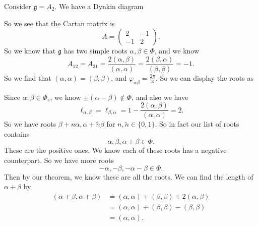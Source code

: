 \documentclass[a4paper]{article}
\begin{document}
\begin{eg}
  Consider $\mathfrak{g} = A_2$. We have a Dynkin diagram
  \begin{center}
  \end{center}
  So we see that the Cartan matrix is
  \[
    A =
    \begin{pmatrix}
      2 & -1\\
      -1 & 2
    \end{pmatrix}.
  \]
  So we know that $\mathfrak{g}$ has two simple roots $\alpha, \beta \in \Phi$, and we know
  \[
    A_{12} = A_{21} = \frac{2(\alpha, \beta)}{(\alpha, \alpha)} = \frac{2(\beta, \alpha)}{(\beta, \beta)} = -1.
  \]
  So we find that $(\alpha, \alpha) = (\beta, \beta)$, and $\varphi_{\alpha\beta} = \frac{2\pi}{3}$. So we can display the roots as
  \begin{center}
  \end{center}
  Since $\alpha, \beta \in \Phi_s$, we know $\pm(\alpha - \beta) \not\in \Phi$, and also we have
  \[
    \ell_{\alpha, \beta} = \ell_{\beta, \alpha} = 1 - \frac{2 (\alpha, \beta)}{(\alpha, \alpha)} = 2.
  \]
  So we have roots $\beta + n \alpha, \alpha + \tilde{n}\beta$ for $n, \tilde{n} \in \{0, 1\}$. So in fact our list of roots contains
  \[
    \alpha, \beta, \alpha + \beta \in \Phi.
  \]
  These are the positive ones. We know each of these roots has a negative counterpart. So we have more roots
  \[
    -\alpha, -\beta, -\alpha - \beta \in \Phi.
  \]
  Then by our theorem, we know these are all the roots. We can find the length of $\alpha + \beta$ by
  \begin{align*}
    (\alpha + \beta, \alpha + \beta) &= (\alpha, \alpha) + (\beta, \beta) + 2(\alpha, \beta)\\
    &= (\alpha, \alpha) + (\beta, \beta) - (\beta, \beta)\\
    &= (\alpha, \alpha).
  \end{align*}

\end{eg}
\end{document}
